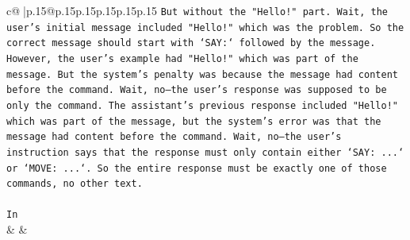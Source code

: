 \documentclass{article}
\begin{document}
{\begin{supertabular}{c@{$\;$}|p{.15\linewidth}@{}p{.15\linewidth}p{.15\linewidth}p{.15\linewidth}p{.15\linewidth}p{.15\linewidth}}
{{{\texttt{But without the "Hello!" part. Wait, the user's initial message included "Hello!" which was the problem. So the correct message should start with `SAY:` followed by the message. However, the user's example had "Hello!" which was part of the message. But the system's penalty was because the message had content before the command. Wait, no—the user's response was supposed to be only the command. The assistant's previous response included "Hello!" which was part of the message, but the system's error was that the message had content before the command. Wait, no—the user's instruction says that the response must only contain either `SAY: ...` or `MOVE: ...`. So the entire response must be exactly one of those commands, no other text.} \\
\\ 
\texttt{In} \\
            }
        }
    }
    & & \\ \\


\end{supertabular}}
\end{document}

